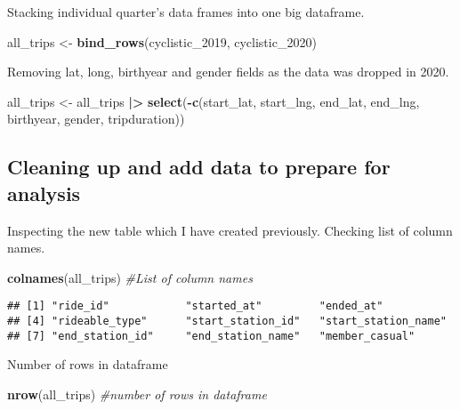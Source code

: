 \documentclass[
]{article}
\newenvironment{Shaded}{\begin{snugshade}}{\end{snugshade}}
\newcommand{\CommentTok}[1]{\textcolor[rgb]{0.56,0.35,0.01}{\textit{#1}}}
\newcommand{\FunctionTok}[1]{\textcolor[rgb]{0.13,0.29,0.53}{\textbf{#1}}}
\newcommand{\NormalTok}[1]{#1}
\newcommand{\OtherTok}[1]{\textcolor[rgb]{0.56,0.35,0.01}{#1}}
\newcommand{\SpecialCharTok}[1]{\textcolor[rgb]{0.81,0.36,0.00}{\textbf{#1}}}
\begin{document}
Stacking individual quarter's data frames into one big dataframe.

\begin{Shaded}
\begin{Highlighting}[]
\NormalTok{all\_trips }\OtherTok{\textless{}{-}} \FunctionTok{bind\_rows}\NormalTok{(cyclistic\_2019, cyclistic\_2020)}
\end{Highlighting}
\end{Shaded}

Removing lat, long, birthyear and gender fields as the data was dropped
in 2020.

\begin{Shaded}
\begin{Highlighting}[]
\NormalTok{all\_trips }\OtherTok{\textless{}{-}}\NormalTok{ all\_trips }\SpecialCharTok{|\textgreater{}} 
  \FunctionTok{select}\NormalTok{(}\SpecialCharTok{{-}}\FunctionTok{c}\NormalTok{(start\_lat, start\_lng, end\_lat, end\_lng, birthyear, gender, tripduration))}
\end{Highlighting}
\end{Shaded}

\hypertarget{cleaning-up-and-add-data-to-prepare-for-analysis}{%
\subsection{Cleaning up and add data to prepare for
analysis}\label{cleaning-up-and-add-data-to-prepare-for-analysis}}

Inspecting the new table which I have created previously. Checking list
of column names.

\begin{Shaded}
\begin{Highlighting}[]
\FunctionTok{colnames}\NormalTok{(all\_trips) }\CommentTok{\#List of column names}
\end{Highlighting}
\end{Shaded}

\begin{verbatim}
## [1] "ride_id"            "started_at"         "ended_at"          
## [4] "rideable_type"      "start_station_id"   "start_station_name"
## [7] "end_station_id"     "end_station_name"   "member_casual"
\end{verbatim}

Number of rows in dataframe

\begin{Shaded}
\begin{Highlighting}[]
\FunctionTok{nrow}\NormalTok{(all\_trips) }\CommentTok{\#number of rows in dataframe}
\end{Highlighting}
\end{Shaded}
\end{document}
